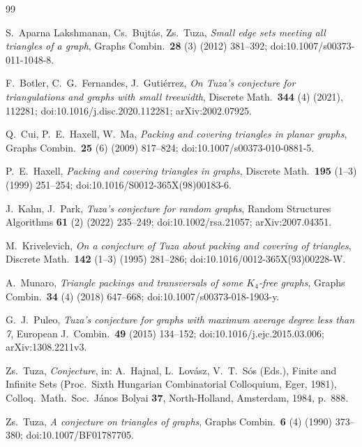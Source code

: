 \documentclass[11pt,a4paper]{amsart}
\theoremstyle{plain}
\theoremstyle{definition}
\begin{document}
\raggedright
\begin{thebibliography}{99}

S.~Aparna Lakshmanan, Cs.~Bujt\'as, Zs.~Tuza,
\emph{Small edge sets meeting all triangles of a graph},
Graphs Combin.\ \textbf{28} (3) (2012) 381--392;
doi:10.1007/s00373-011-1048-8.

F.~Botler, C.~G.~Fernandes, J.~Guti\'errez,
\emph{On Tuza's conjecture for triangulations and graphs with small
treewidth}, Discrete Math.\ \textbf{344} (4) (2021), 112281;
doi:10.1016/j.disc.2020.112281; arXiv:2002.07925.

Q.~Cui, P.~E.~Haxell, W.~Ma,
\emph{Packing and covering triangles in planar graphs},
Graphs Combin.\ \textbf{25} (6) (2009) 817--824;
doi:10.1007/s00373-010-0881-5.

P.~E.~Haxell,
\emph{Packing and covering triangles in graphs},
Discrete Math.\ \textbf{195} (1--3) (1999) 251--254;
doi:10.1016/S0012-365X(98)00183-6.

J.~Kahn, J.~Park,
\emph{Tuza's conjecture for random graphs},
Random Structures Algorithms \textbf{61} (2) (2022) 235--249;
doi:10.1002/rsa.21057; arXiv:2007.04351.

M.~Krivelevich,
\emph{On a conjecture of Tuza about packing and covering of triangles},
Discrete Math.\ \textbf{142} (1--3) (1995) 281--286;
doi:10.1016/0012-365X(93)00228-W.

A.~Munaro,
\emph{Triangle packings and transversals of some $K_4$-free graphs},
Graphs Combin.\ \textbf{34} (4) (2018) 647--668;
doi:10.1007/s00373-018-1903-y.

G.~J.~Puleo,
\emph{Tuza's conjecture for graphs with maximum average degree less than 7},
European J.\ Combin.\ \textbf{49} (2015) 134--152;
doi:10.1016/j.ejc.2015.03.006; arXiv:1308.2211v3.

Zs.~Tuza,
\emph{Conjecture}, in: A.~Hajnal, L.~Lov\'asz, V.~T.~S\'os (Eds.),
Finite and Infinite Sets (Proc.\ Sixth Hungarian Combinatorial Colloquium,
Eger, 1981), Colloq.\ Math.\ Soc.\ J\'anos Bolyai \textbf{37},
North-Holland, Amsterdam, 1984, p.~888.

Zs.~Tuza,
\emph{A conjecture on triangles of graphs},
Graphs Combin.\ \textbf{6} (4) (1990) 373--380;
doi:10.1007/BF01787705.

\end{thebibliography}
\end{document}
